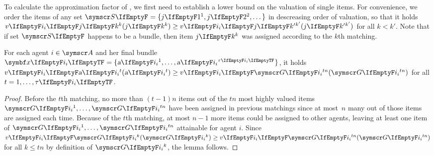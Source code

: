 To calculate the approximation factor of \SMatch, we first need to establish a lower bound on the valuation of single items.
For convenience, we order the items of any set \(\genericset = \{ \genericitem[1], \genericitem[2], \dots \}\) in descreasing order of valuation, so that it holds \(\valuations[\genericitem[k]] \ge \valuations[\genericitem[k']]\) for all \(k < k'\).
Note that if set \(\genericset\) happens to be a bundle, then item \(\genericitem[k]\) was assigned according to the \(k\)th matching.
\begin{lemma}
	\label{lem:lower_bound_single_item}
	For each agent \(i \in \agents\) and her final bundle \(\alloc = \{\asgd{1}, \dots, \asgd{\alloclen}\}\), it holds \(\valuations[\asgd{t}] \ge \valuations[\goodsordered{tn}]\) for all \(t = 1, \dots, \alloclen\).
\end{lemma}
\begin{proof}
	Before the \(t\)th matching, no more than \((t-1) n\) items out of the \(tn\) most highly valued items \(\goodsordered{1}, \dots, \goodsordered{tn}\) have been assigned in previous matchings since at most~\(n\) many out of those items are assigned each time.
	Because of the \(t\)th matching, at most \(n-1\) more items could be assigned to other agents, leaving at least one item of \(\goodsordered{1}, \dots, \goodsordered{tn}\) attainable for agent \(i\).
	Since \(\valuations[\goodsordered{k}] \ge \valuations[\goodsordered{tn}]\) for all \(k \le tn\) by definition of \(\goodsordered{k}\), the lemma follows.
\end{proof}

